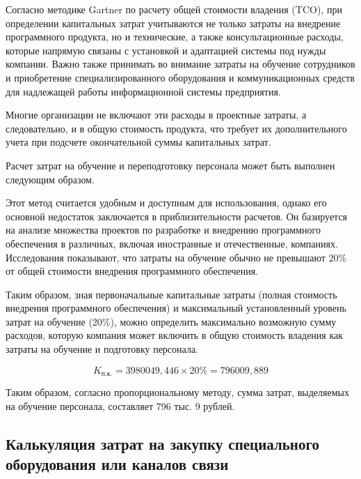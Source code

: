 Согласно методике Gartner по расчету общей стоимости владения (TCO), при определении капитальных затрат учитываются не только затраты на внедрение программного продукта, но и технические, а также консультационные расходы, которые напрямую связаны с установкой и адаптацией системы под нужды компании. Важно также принимать во внимание затраты на обучение сотрудников и приобретение специализированного оборудования и коммуникационных средств для надлежащей работы информационной системы предприятия.

Многие организации не включают эти расходы в проектные затраты, а следовательно, и в общую стоимость продукта, что требует их дополнительного учета при подсчете окончательной суммы капитальных затрат.

Расчет затрат на обучение и переподготовку персонала может быть выполнен следующим образом.

Этот метод считается удобным и доступным для использования, однако его основной недостаток заключается в приблизительности расчетов. Он базируется на анализе множества проектов по разработке и внедрению программного обеспечения в различных, включая иностранные и отечественные, компаниях. Исследования показывают, что затраты на обучение обычно не превышают 20\% от общей стоимости внедрения программного обеспечения.

Таким образом, зная первоначальные капитальные затраты (полная стоимость внедрения программного обеспечения) и максимальный установленный уровень затрат на обучение (20\%), можно определить максимально возможную сумму расходов, которую компания может включить в общую стоимость владения как затраты на обучение и подготовку персонала.

\begin{equation}\label{eq:kpk}
	K_{\text{п.к.}} = 3980049{,}446 \times 20 \% = 796009{,}889
\end{equation}

Таким образом, согласно пропорциональному методу, сумма затрат, выделяемых на обучение персонала, составляет 796 тыс. 9 рублей.

\subsection{Калькуляция затрат на закупку специального оборудования или каналов связи}


